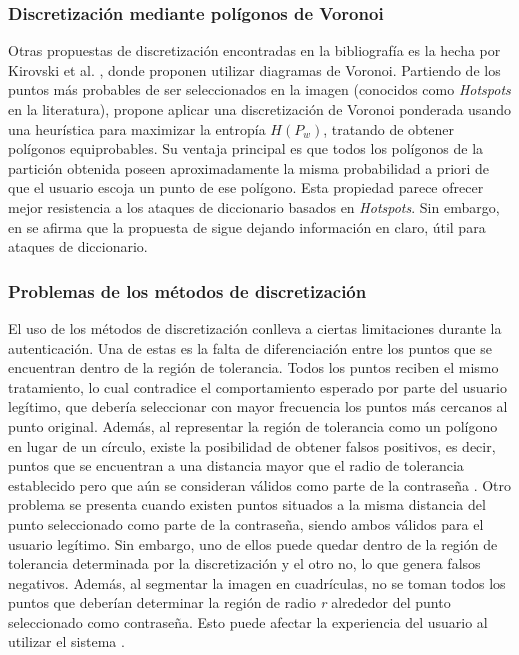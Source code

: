 \subsubsection{Discretización mediante polígonos de Voronoi}
Otras propuestas de discretización encontradas en la bibliografía es la hecha por Kirovski et al. \cite{kirovski2007click}, donde proponen utilizar diagramas de Voronoi. Partiendo de los puntos más probables de ser seleccionados en la imagen (conocidos como \textit{Hotspots} en la literatura), propone aplicar una discretización de Voronoi ponderada usando una heurística para maximizar la entropía \(H(P_w)\), tratando de obtener polígonos equiprobables. Su ventaja principal es que todos los polígonos de la partición obtenida poseen aproximadamente la misma probabilidad a priori de que el usuario escoja un punto de ese polígono. Esta propiedad parece ofrecer mejor resistencia a los ataques de diccionario basados en \textit{Hotspots}. Sin embargo, en \cite{zhu2013securityl} se afirma que la propuesta de \cite{kirovski2007click} sigue dejando información en claro, útil para ataques de diccionario.

\subsubsection{Problemas de los métodos de discretización}
	
El uso de los métodos de discretización conlleva a ciertas limitaciones durante la autenticación. Una de estas es la falta de diferenciación entre los puntos que se encuentran dentro de la región de tolerancia. Todos los puntos reciben el mismo tratamiento, lo cual contradice el comportamiento esperado por parte del usuario legítimo, que debería seleccionar con mayor frecuencia los puntos más cercanos al punto original. Además, al representar la región de tolerancia como un polígono en lugar de un círculo, existe la posibilidad de obtener falsos positivos, es decir, puntos que se encuentran a una distancia mayor que el radio de tolerancia establecido pero que aún se consideran válidos como parte de la contraseña \cite{blonder1996graphical, borrego2018debilidades}. Otro problema se presenta cuando existen puntos situados a la misma distancia del punto seleccionado como parte de la contraseña, siendo ambos válidos para el usuario legítimo. Sin embargo, uno de ellos puede quedar dentro de la región de tolerancia determinada por la discretización y el otro no, lo que genera falsos negativos. Además, al segmentar la imagen en cuadrículas, no se toman todos los puntos que deberían determinar la región de radio \textit{r} alrededor del punto seleccionado como contraseña. Esto puede afectar la experiencia del usuario al utilizar el sistema \cite{bicakci2008optimal, borrego2018debilidades}.


